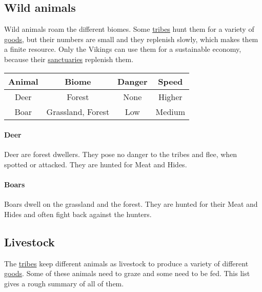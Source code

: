 \subsection{Wild animals}\label{ch:World:Inhabitants:Animals}
Wild animals roam the different biomes. Some \hyperref[ch:Tribes]{tribes} hunt
them for a variety of \hyperref[ch:Goods:Nature:Animals]{goods}, but their
numbers are small and they replenish slowly, which makes them a finite
resource. Only the \gls{Vikings} can use them for a sustainable economy,
because their \hyperref[ch:Tribes:Vikings:Religion:Forest]{sanctuaries}
replenish them.

\begin{longtable}{cccc}
	\toprule
	Animal & Biome                         & Danger & Speed  \\
	\midrule
	\Gls{Deer}   & \Gls{Forest}                  & None   & Higher \\
	\Gls{Boar}   & \Gls{Grassland}, \Gls{Forest} & Low    & Medium \\
	\bottomrule
\end{longtable}

\paragraph{Deer}
Deer are forest dwellers. They pose no danger to the tribes and flee, when
spotted or attacked. They are hunted for \gls{Meat} and \glspl{Hide}.

\paragraph{Boars}
Boars dwell on the grassland and the forest. They are hunted for their
\gls{Meat} and \glspl{Hide} and often fight back against the hunters.

\subsection{Livestock}\label{ch:World:Inhabitants:Livestock}
The \hyperref[ch:Tribes]{tribes} keep different animals as livestock to produce
a variety of different \hyperref[label]{goods}. Some of these animals need to
graze and some need to be fed. This list gives a rough summary of all of them.

\printglossary[type=creature, title=Creature-Glossary]{}\label{ch:World:CreaturesGlossary}

